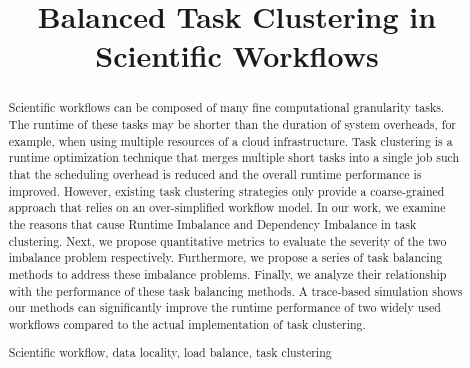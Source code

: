\documentclass[final]{IEEEtran}
\begin{document}
\title{Balanced Task Clustering in Scientific Workflows}


\author{
}

\maketitle

\begin{abstract}
Scientific workflows can be composed of many fine computational granularity tasks. The runtime of these tasks may be shorter than the duration of system overheads, for example, when using multiple resources of a cloud infrastructure. Task clustering is a runtime optimization technique that merges multiple short tasks into a single job such that the scheduling overhead is reduced and the overall runtime performance is improved. However, existing task clustering strategies only provide a coarse-grained approach that relies on an over-simplified workflow model. In our work, we examine the reasons that cause Runtime Imbalance and Dependency Imbalance in task clustering. Next, we propose quantitative metrics to evaluate the severity of the two imbalance problem respectively. Furthermore, we propose a series of task balancing methods to address these imbalance problems. Finally, we analyze their relationship with the performance of these task balancing methods. A trace-based simulation shows our methods can significantly improve the runtime performance of two widely used workflows compared to the actual implementation of task clustering.

\begin{IEEEkeywords}
Scientific workflow, data locality, load balance, task clustering
\end{IEEEkeywords}
\end{abstract}
\end{document}
